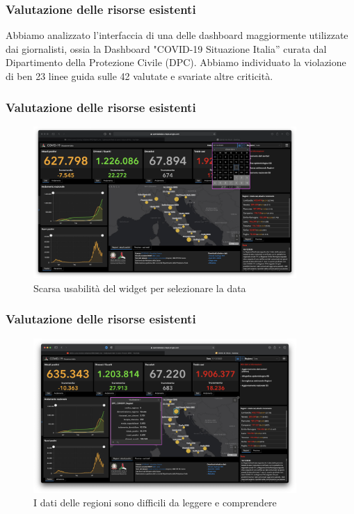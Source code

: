 \documentclass[handout]{beamer}
\begin{document}
			\begin{frame}
				\frametitle{Valutazione delle risorse esistenti}
				Abbiamo analizzato l'interfaccia di una delle dashboard maggiormente utilizzate dai giornalisti, ossia la Dashboard "COVID-19 Situazione Italia'' curata dal Dipartimento della Protezione Civile (DPC). \newline \newline
				Abbiamo individuato la violazione di ben 23 linee guida sulle 42 valutate e svariate altre criticità. 
			\end{frame}

			\begin{frame}
				\frametitle{Valutazione delle risorse esistenti}
				\begin{figure}
					\includegraphics[width=10cm]{img/guidelines_violations_8}
					\caption{Scarsa usabilità del widget per selezionare la data}
				\end{figure}
			\end{frame}

			\begin{frame}
				\frametitle{Valutazione delle risorse esistenti}
				\begin{figure}
					\includegraphics[width=10cm]{img/guidelines_violations_10}
					\caption{I dati delle regioni sono difficili da leggere e comprendere}
				\end{figure}
			\end{frame}
\end{document}
